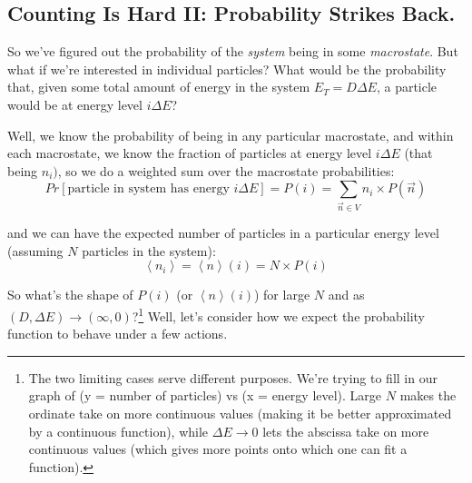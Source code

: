 \documentclass[letterpaper,12pt]{report}
\begin{document}
\subsection{Counting Is Hard II: Probability Strikes Back.}

So we've figured out the probability of the \emph{system} being in some \emph{macrostate}.
But what if we're interested in individual particles?
What would be the probability that, given some total
amount of energy in the system \(E_{{T}}=D\Delta E\),
a particle would be at energy level \(i\Delta E\)?

Well, we know the probability of being in any particular macrostate, and within each
macrostate, we know the fraction of particles at energy level \(i\Delta E\) 
(that being \(n_i)\),
so we do a weighted sum over the macrostate probabilities:
\[Pr[\text{particle in system has energy }i\Delta E] = P(i) =
\sum_{\vec{n}\in V}n_i \times P(\vec{n})\]

and we can have the expected number of particles in a particular energy level (assuming
\(N\) particles in the system):
\[\left<n_i\right> = \left<n\right>(i) = N \times P(i)\]

So what's the shape of \(P(i)\) (or \(\left<n\right>(i)\)) for large \(N\) and as 
\(\left(D,\Delta E\right) \rightarrow \left(\infty,0\right)\)?\footnote{
  The two limiting cases serve different purposes. We're trying to fill in our graph
  of (y = number of particles) vs (x = energy level). Large \(N\) makes the ordinate
  take on more continuous values (making it be better approximated by a continuous function),
  while \(\Delta E \rightarrow 0\) lets the abscissa take
  on more continuous values (which gives more points onto which one can fit a function).
} 
Well, let's consider how we expect the probability function to behave under a few actions.
\end{document}
